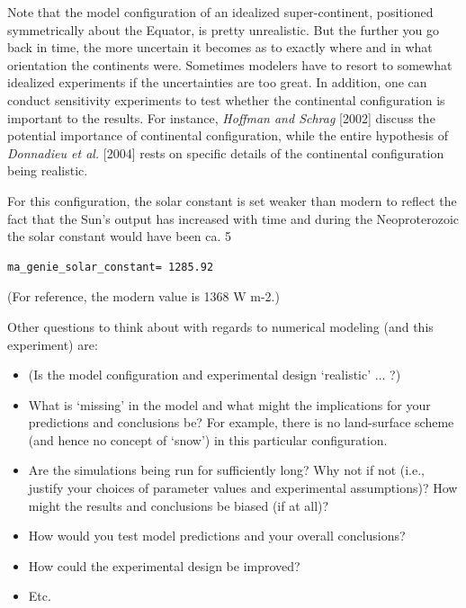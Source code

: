 \documentclass[11pt,fleqn]{book} %
\begin{document}
Note that the model configuration of an idealized super-continent, positioned symmetrically about the Equator, is pretty unrealistic. But the further you go back in time, the more uncertain it becomes as to exactly where and in what orientation the continents were. Sometimes modelers have to resort to somewhat idealized experiments if the uncertainties are too great. In addition, one can conduct sensitivity experiments to test whether the continental configuration is important to the results. For instance, \textit{Hoffman and Schrag} [2002] discuss the potential importance of continental configuration, while the entire hypothesis of \textit{Donnadieu et al.} [2004] rests on specific details of the continental configuration being realistic.

For this configuration, the solar constant is set weaker than modern to reflect the fact that the Sun’s output has increased with time and during the Neoproterozoic the solar constant would have been ca. 5%

\begin{verbatim}
ma_genie_solar_constant= 1285.92
\end{verbatim}

\noindent(For reference, the modern value is 1368 W m-2.)

Other questions to think about with regards to numerical modeling (and this experiment) are:

\begin{itemize}[noitemsep]
\setlength{\itemindent}{.2in}
\item  (Is the model configuration and experimental design ‘realistic’ ... ?)
\item  What is ‘missing’ in the model and what might the implications for your predictions and conclusions be? For example, there is no land-surface scheme (and hence no concept of ‘snow’) in this particular configuration.
\item Are the simulations being run for sufficiently long? Why not if not (i.e., justify your choices of parameter values and experimental assumptions)? How might the results and conclusions be biased (if at all)?
\item How would you test model predictions and your overall conclusions?
\item How could the experimental design be improved?
\item Etc.
\end{itemize}
\end{document}
